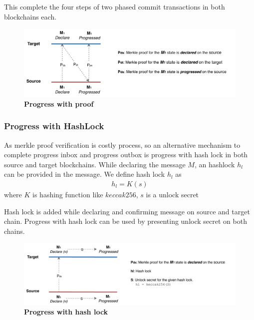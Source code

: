 \documentclass[12pt,a4paper]{article}
\begin{document}
This complete the four steps of two phased commit transactions in both blockchains each. 

\begin{figure}[htb]
    \centering
	\includegraphics[width=\textwidth]{progress_with_proof}
	\caption{\textbf{Progress with proof}}
	\label{fig:progress_with_proof}
\end{figure}

\subsubsection{Progress with HashLock}\label{gateway:progresshashlock} 
As merkle proof verification is costly process, so an alternative mechanism to complete progress inbox and progress outbox is progress with hash lock in both source and target blockchains. 
While declaring the message $M$, an hashlock $h_l$ can be provided in the message. 
We define hash lock $h_l$ as
\begin{align}
	h_l = K(s)
\end{align}
where $K$ is hashing function like $keccak256$, $s$ is a unlock secret 

Hash lock is added while declaring and confirming message on source and target chain. 
Progress with hash lock can be used by presenting unlock secret on both chains.
\begin{figure}[htb]
    \centering
	\includegraphics[width=\textwidth]{progress_with_hashlock}
	\caption{\textbf{Progress with hash lock}}
	\label{fig:progress_with_hashlock}
\end{figure}
\end{document}
